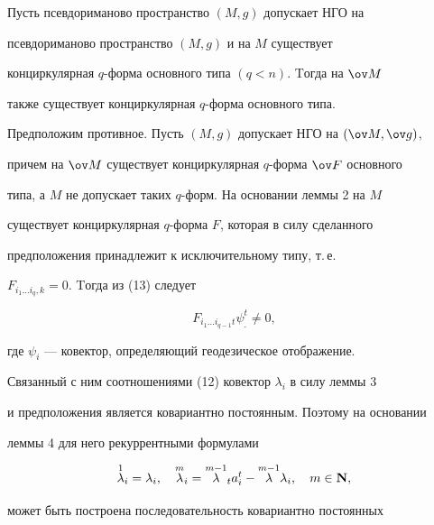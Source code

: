\begin{thm}


Пусть псевдориманово пространство $(M,g)$ допускает НГО на 


псевдориманово пространство $(M,g)$ и на $M$ существует


конциркулярная $q$-форма основного типа $(q<n)$. Tогда на $\ov M$


также существует конциркулярная $q$-форма основного типа.


\end{thm}





\begin{pf}


Предположим противное. Пусть $(M,g)$ допускает НГО на $(\ov M, \ov g)$, 


причем на $\ov M$ существует конциркулярная $q$-форма $\ov F$ основного 


типа, а $M$ не допускает таких $q$-форм. На основании леммы 2 на $M$ 


существует конциркулярная $q$-форма $F$, которая в силу сделанного


предположения принадлежит к исключительному типу, т.\,е.


$F_{i_1\dotsc i_q, k}=0$. Tогда из (13) следует


\begin{equation}


F_{i_1\dotsc i_{q-1}t }\psi_.^t\neq 0,


\end{equation}


где $\psi_i$ --- ковектор, определяющий геодезическое отображение. 


Связанный с ним соотношениями (12) ковектор $\lambda_i$ в силу леммы 3 


и предположения является ковариантно постоянным. Поэтому на основании


леммы 4 для него рекуррентными формулами


\begin{equation}


\overset{1}{\lambda}{}_i =\lambda_i,\quad


\overset{m}{\lambda}{}_i=\overset{m-1}{\lambda}{}_t a_i^t -


\overset{m-1}{\lambda}{}\lambda_i, \quad m\in \bold N,


\end{equation}


может быть построена последовательность ковариантно постоянных 



\end{pf}
